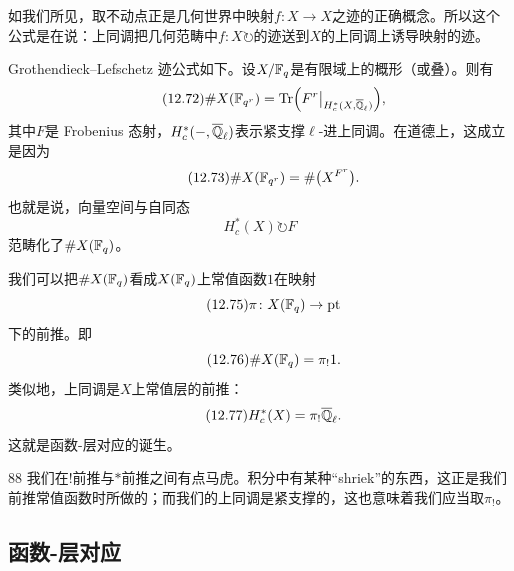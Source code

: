 如我们所见，取不动点正是几何世界中映射$f\colon X\to X$之迹的正确概念。所以这个公式是在说：上同调把几何范畴中$f\colon X\circlearrowright$的迹送到$X$的上同调上诱导映射的迹。

Grothendieck–Lefschetz 迹公式如下。设$X/\mathbb{F}_q$是有限域上的概形（或叠）。则有
\begin{equation}\tag{12.72}
\#X(\mathbb{F}_{q^{r}})=\operatorname{Tr}\Bigl(F^{r}\big|_{H^{*}_{c}(X,\overline{\mathbb{Q}}_{\ell})}\Bigr),
\end{equation}
其中$F$是 Frobenius 态射，$H^{*}_{c}(-,\overline{\mathbb{Q}}_{\ell})$表示紧支撑$\ell$-进上同调。在道德上，这成立是因为
\begin{equation}\tag{12.73}
\#X(\mathbb{F}_{q^{r}})=\#\bigl(X^{F^{r}}\bigr).
\end{equation}
也就是说，向量空间与自同态
\begin{equation}\tag{12.74}
H^{*}_{c}(X)\circlearrowright F
\end{equation}
范畴化了$\#X(\mathbb{F}_{q})$。

我们可以把$\#X(\mathbb{F}_{q})$看成$X(\mathbb{F}_{q})$上常值函数$1$在映射
\begin{equation}\tag{12.75}
\pi\colon X(\mathbb{F}_{q})\to\mathrm{pt}
\end{equation}
下的前推。即
\begin{equation}\tag{12.76}
\#X(\mathbb{F}_{q})=\pi_{!}1.
\end{equation}
类似地，上同调是$X$上常值层的前推：
\begin{equation}\tag{12.77}
H^{*}_{c}(X)=\pi_{!}\overline{\mathbb{Q}}_{\ell}.
\end{equation}
这就是函数-层对应的诞生。

\begin{srcrem}{88}
我们在$!$前推与$*$前推之间有点马虎。积分中有某种“shriek”的东西，这正是我们前推常值函数时所做的；而我们的上同调是紧支撑的，这也意味着我们应当取$\pi_{!}$。
\end{srcrem}

\subsection{函数-层对应}\label{sec:12-7-1}

